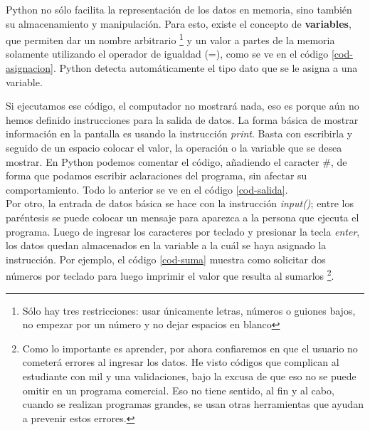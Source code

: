 Python no sólo facilita la representación de los datos en memoria, sino también su almacenamiento y manipulación. Para esto, existe el concepto de \textbf{variables}, que permiten dar un nombre arbitrario \footnote{Sólo hay tres restricciones: usar únicamente letras, números o guiones bajos, no empezar por un número y no dejar espacios en blanco} y un valor a partes de la memoria solamente utilizando el operador de igualdad (=), como se ve en el código \ref{cod-asignacion}. Python detecta automáticamente el tipo dato que se le asigna a una variable. \\

\newpage



Si ejecutamos ese código, el computador no mostrará nada, eso es porque aún no hemos definido instrucciones para la salida de datos. La forma básica de mostrar información en la pantalla es usando la instrucción \emph{print}. Basta con escribirla y seguido de un espacio colocar el valor, la operación o la variable que se desea mostrar. En Python podemos comentar el código, añadiendo el caracter \#, de forma que podamos escribir aclaraciones del programa, sin afectar su comportamiento. Todo lo anterior se ve en el código \ref{cod-salida}. \\




Por otro, la entrada de datos básica se hace con la instrucción \emph{input()}; entre los paréntesis se puede colocar un mensaje para aparezca a la persona que ejecuta el programa. Luego de ingresar los caracteres por teclado y presionar la tecla \emph{enter}, los datos quedan almacenados en la variable a la cuál se haya asignado la instrucción. Por ejemplo, el código \ref{cod-suma} muestra como solicitar dos números por teclado para luego imprimir el valor que resulta al sumarlos \footnote{Como lo importante es aprender, por ahora confiaremos en que el usuario no cometerá errores al ingresar los datos. He visto códigos que complican al estudiante con mil y una validaciones, bajo la excusa de que eso no se puede omitir en un programa comercial. Eso no tiene sentido, al fin y al cabo, cuando se realizan programas grandes, se usan otras herramientas que ayudan a prevenir estos errores.}. \\


